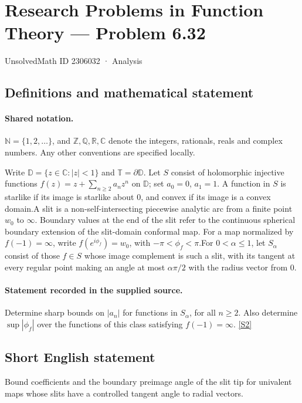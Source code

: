 \documentclass[11pt]{article}
\newcommand{\sref}[2]{\hyperlink{source:#1:#2}{[S#2]}}
\begin{document}
\setcounter{section}{2306031}
\section{Research Problems in Function Theory — Problem 6.32}\label{2306032}
{\small\sffamily UnsolvedMath ID 2306032 · Analysis}
\subsection{Definitions and mathematical statement}

\paragraph{Shared notation.}$\mathbb N=\{1,2,\ldots\}$, and $\mathbb Z,\mathbb Q,\mathbb R,\mathbb C$ denote the integers, rationals, reals and complex numbers. Any other conventions are specified locally.


Write $\mathbb D=\{z\in\mathbb C:|z|<1\}$ and $\mathbb T=\partial\mathbb D$. Let $S$ consist of holomorphic injective functions $f(z)=z+\sum_{n\ge2}a_nz^n$ on $\mathbb D$; set $a_0=0$, $a_1=1$. A function in $S$ is starlike if its image is starlike about $0$, and convex if its image is a convex domain.A slit is a non-self-intersecting piecewise analytic arc from a finite point $w_0$ to $\infty$. Boundary values at the end of the slit refer to the continuous spherical boundary extension of the slit-domain conformal map. For a map normalized by $f(-1)=\infty$, write $f(e^{i\phi_f})=w_0$, with $-\pi<\phi_f<\pi$.For $0<\alpha\le1$, let $S_\alpha$ consist of those $f\in S$ whose image complement is such a slit, with its tangent at every regular point making an angle at most $\alpha\pi/2$ with the radius vector from $0$.
\paragraph{Statement recorded in the supplied source.}
Determine sharp bounds on $|a_n|$ for functions in $S_\alpha$, for all $n\ge2$. Also determine $\sup|\phi_f|$ over the functions of this class satisfying $f(-1)=\infty$. \sref{2306032}{2}
\subsection{Short English statement}
Bound coefficients and the boundary preimage angle of the slit tip for univalent maps whose slits have a controlled tangent angle to radial vectors.
\end{document}
